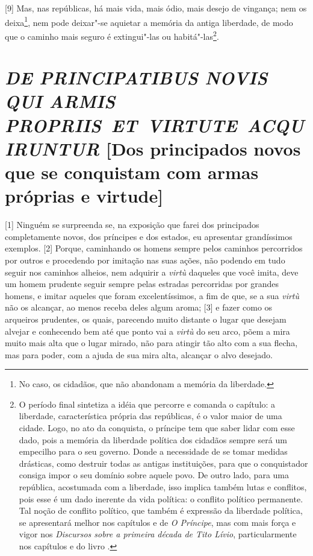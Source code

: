 {[}9{]} Mas, nas repúblicas, há mais vida, mais ódio, mais desejo de
vingança; nem os deixa\footnote{No caso, os cidadãos, que não abandonam
  a memória da liberdade.}, nem pode deixar"-se aquietar a memória da
antiga liberdade, de modo que o caminho mais seguro é extingui"-las ou
habitá"-las\footnote{O período final sintetiza a idéia que percorre e
  comanda o capítulo: a liberdade, característica própria das
  repúblicas, é o valor maior de uma cidade. Logo, no ato da conquista,
  o príncipe tem que saber lidar com esse dado, pois a memória da
  liberdade política dos cidadãos sempre será um empecilho para o seu
  governo. Donde a necessidade de se tomar medidas drásticas, como
  destruir todas as antigas instituições, para que o conquistador
  consiga impor o seu domínio sobre aquele povo. De outro lado, para uma
  república, acostumada com a liberdade, isso implica também lutas e
  conflitos, pois esse é um dado inerente da vida política: o conflito
  político permanente. Tal noção de conflito político, que também é
  expressão da liberdade política, se apresentará melhor nos capítulos
   e  de \emph{O Príncipe}, mas com mais força e vigor nos
  \emph{Discursos sobre a primeira década de Tito Lívio},
  particularmente nos capítulos  e  do livro .}.

\quebra\section{\emph{DE PRINCIPATIBUS NOVIS QUI ARMIS PROPRIIS~ET~VIRTUTE~ACQUIRUNTUR}\break
{[}Dos principados novos que se conquistam com armas próprias e virtude{]}}

{[}1{]} Ninguém se surpreenda se, na exposição que farei dos principados
completamente novos, dos príncipes e dos estados, eu apresentar
grandíssimos exemplos. {[}2{]} Porque, caminhando os homens sempre pelos
caminhos percorridos por outros e procedendo por imitação nas suas
ações, não podendo em tudo seguir nos caminhos alheios, nem adquirir a
\emph{virtù} daqueles que você imita, deve um homem prudente seguir
sempre pelas estradas percorridas por grandes homens, e imitar aqueles
que foram excelentíssimos, a fim de que, se a sua \emph{virtù} não os
alcançar, ao menos receba deles algum aroma; {[}3{]} e fazer como os
arqueiros prudentes, os quais, parecendo muito distante o lugar que
desejam alvejar e conhecendo bem até que ponto vai a \emph{virtù} do seu
arco, põem a mira muito mais alta que o lugar mirado, não para atingir
tão alto com a sua flecha, mas para poder, com a ajuda de sua mira alta,
alcançar o alvo desejado.

